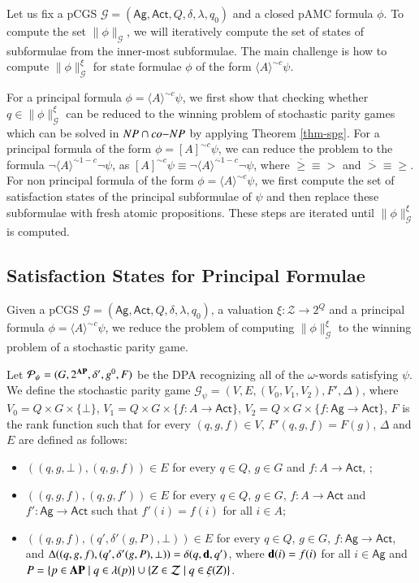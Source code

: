 \documentclass[letterpaper]{article}
\newcommand{\AP}{{\bf AP}}
\newcommand{\calZ}{\mathcal{Z}}
\newcommand{\calM}{\mathcal{G}}
\newcommand{\Ag}{\textsf{Ag}}
\newcommand{\Act}{\textsf{Act}}
\newcommand{\PA}{\mathcal{P}}
\newcommand{\dec}{{\bf d}}
\newcommand{\pamc}{{pAMC}\xspace}
\newcommand{\opA}[1]{\langle{#1}\rangle}
\newcommand{\opUA}[1]{[{#1}]}
\newcommand {\semantics}[1]{\|{#1}\|}  %
\begin{document}
Let us fix a pCGS $\calM=(\Ag,\Act, Q, \delta,\lambda,q_0)$ and a closed \pamc formula $\phi$.
To compute the set $\semantics{\phi}_\calM$, we will iteratively compute the set of states of subformulae from the inner-most subformulae.
The main challenge is how to compute $\semantics{\phi}_\calM^\xi$ for state formulae $\phi$ of the form $\opA{A}^{\sim c}\psi$.

For a principal formula $\phi=\opA{A}^{\sim c}\psi$,
we first show that checking whether $q\in\semantics{\phi}_\calM^\xi$ can be reduced to the winning problem of stochastic parity games which can be solved in ${\sc NP\cap co{-}NP}$ by applying Theorem \ref{thm-spg}.
For a principal formula of the form $\phi=\opUA{A}^{\sim c}\psi$, we can reduce the problem to
the formula $\neg \opA{A}^{\overline{\sim} 1-c}\neg \psi$, as $\opUA{A}^{\sim c}\psi \equiv \neg \opA{A}^{\overline{\sim} 1-c}\neg \psi$, where
$\overline{\geq}\equiv>$ and $\overline{>}\equiv\geq$.
For non principal formula of the form $\phi=\opA{A}^{\sim c}\psi$, we first compute the set of satisfaction states of the principal subformulae
of $\psi$ and then replace these subformulae with fresh atomic propositions. These steps are iterated until
$\semantics{\phi}_\calM^\xi$ is computed.


\subsection{Satisfaction States for Principal Formulae}
Given a pCGS $\calM=(\Ag,\Act, Q, \delta,\lambda,q_0)$, a valuation $\xi:\calZ\rightarrow 2^Q$ and a principal formula $\phi=\opA{A}^{\sim c}\psi$, we reduce the problem of computing $\semantics{\phi}_\calM^\xi$ to the winning problem of a stochastic parity game.

Let $\PA_\psi=(G,2^\AP,\delta', g^0, F)$ be the DPA recognizing all of the $\omega$-words satisfying $\psi$.
We define the stochastic parity game $\calM_\psi=(V,E,(V_0,V_1,V_2),F',\Delta)$, where $V_0=Q\times G\times\{\bot\}$,
$V_1=Q\times G\times\{f:A\rightarrow \Act\}$, $V_2=Q\times G\times\{f:\Ag\rightarrow \Act\}$,  $F$ is the rank function such that for every
$(q,g,f)\in V$, $F'(q,g,f)=F(g)$, $\Delta$ and $E$ are defined as follows:
\begin{itemize}
  \item  $((q,g,\bot),(q,g,f))\in E$ for every $q\in Q$, $g\in G$ and $f:A\rightarrow \Act$, ;
  \item  $((q,g,f),(q,g,f'))\in E$ for  every $q\in Q$, $g\in G$, $f:A\rightarrow \Act$ and  $f':\Ag\rightarrow \Act$ such that $f'(i)=f(i)$ for all $i\in A$;
  \item  $((q,g,f),(q',\delta'(g,P),\bot))\in E$ for every $q\in Q$, $g\in G$,  $f:\Ag\rightarrow \Act$, and $\Delta((q,g,f),(q',\delta'(g,P),\bot))=\delta(q,\dec,q')$, where $\dec(i)=f(i)$ for all $i\in \Ag$ and $P=\{p\in\AP\mid q\in\lambda(p)\}\cup \{Z\in\calZ\mid q\in\xi(Z)\}$.
\end{itemize}
\end{document}
